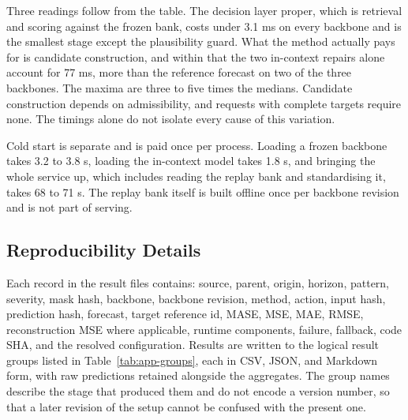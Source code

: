 \documentclass{article}
\begin{document}
Three readings follow from the table. The decision layer proper, which is retrieval and
scoring against the frozen bank, costs under 3.1 ms on every backbone and is the smallest
stage except the plausibility guard. What the method actually pays for is candidate
construction, and within that the two in-context repairs alone account for 77 ms, more than
the reference forecast on two of the three backbones. The maxima are three to five times the
medians. Candidate construction depends on admissibility, and requests with complete targets
require none. The timings alone do not isolate every cause of this variation.

Cold start is separate and is paid once per process. Loading a frozen backbone takes 3.2 to
3.8 s, loading the in-context model takes 1.8 s, and bringing the whole service up, which
includes reading the replay bank and standardising it, takes 68 to 71 s. The replay bank
itself is built offline once per backbone revision and is not part of serving.

\subsection{Reproducibility Details}
\label{app:reprodetails}
Each record in the result files contains: source, parent, origin, horizon, pattern,
severity, mask hash, backbone, backbone revision, method, action, input hash, prediction
hash, forecast, target reference id, MASE, MSE, MAE, RMSE, reconstruction MSE where
applicable, runtime components, failure, fallback, code SHA, and the resolved configuration.
Results are written to the logical result groups listed in Table~\ref{tab:app-groups}, each in
CSV, JSON, and Markdown form, with raw predictions retained alongside the aggregates. The
group names describe the stage that produced them and do not encode a version number, so that
a later revision of the setup cannot be confused with the present one.
\end{document}
